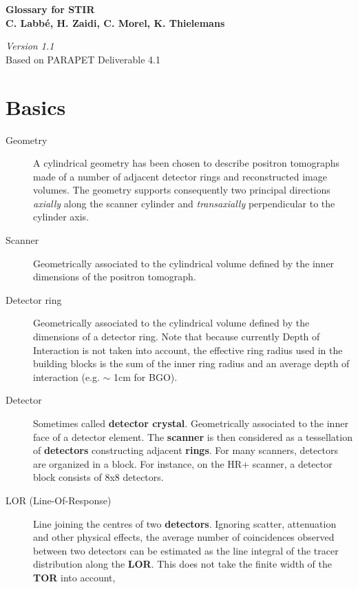 \documentclass{article}
\begin{document}
\begin{center}
\textbf{{\huge Glossary for STIR}}\\
\textbf{C. Labb\'{e}, H. Zaidi, C. Morel, K. Thielemans}
\end{center}

\begin{center}
\textit{Version 1.1}\\
Based on PARAPET Deliverable 4.1


\end{center}

\section*{Basics}

\begin{description}
\item[Geometry] 
A cylindrical geometry has been chosen to describe positron 
tomographs made of a number of adjacent detector rings and reconstructed 
image volumes. The geometry supports consequently two principal 
directions \textit{axially} along the scanner cylinder and \textit{transaxially} 
perpendicular to the cylinder axis.
\item[Scanner] 
Geometrically associated to the cylindrical volume defined by 
the inner dimensions of the positron tomograph.
\item[Detector ring ] 
Geometrically associated to the cylindrical volume defined by 
the dimensions of a detector ring. Note that because currently 
Depth of Interaction is not taken into account, the effective ring radius 
used in the building blocks is the sum of the inner ring radius 
and an average depth of interaction (e.g. \ensuremath{\sim} 1cm for BGO).
\item[Detector] 
Sometimes called \textbf{detector crystal}. Geometrically associated 
to the inner face of a detector element. The \textbf{scanner} is then 
considered as a tessellation of \textbf{detectors} constructing adjacent \textbf{rings}. 
For many scanners, detectors are organized in a block. For instance, 
on the HR+ scanner, a detector block consists of 8x8 detectors.
\item[LOR (Line-Of-Response)] 
Line joining the centres of two \textbf{detectors}. Ignoring scatter, 
attenuation and other physical effects, the average number of 
coincidences observed between two detectors can be estimated 
as the line integral of the tracer distribution along the \textbf{LOR}. 
This does not take the finite width of the \textbf{TOR} into account, 

\end{description}
\end{document}
